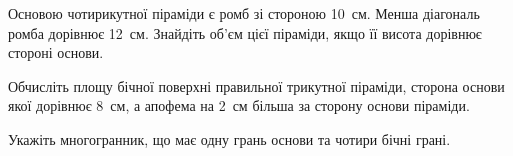 \documentclass[12pt]{article}
\begin{document}
\begin{samepage}
\noindent\zadnum Основою чотирикутної піраміди є ромб зі стороною 10~см. Менша діагональ ромба дорівнює 12~см. Знайдіть об’єм цієї піраміди, якщо її висота дорівнює стороні основи. 

\nmtnobreak
\nopagebreak\nbvspace{0.3cm}
\par{}
\end{samepage}

\begin{samepage}
\noindent\zadnum Обчисліть площу бічної поверхні правильної трикутної піраміди, сторона основи якої дорівнює 8~см, а апофема на 2~см більша за сторону основи піраміди. 

\nmtnobreak
\nopagebreak\nbvspace{0.3cm}
\par{}
\end{samepage}

\begin{samepage}
\noindent\zadnum Укажіть многогранник, що має одну грань основи та чотири бічні грані. 

\nmtnobreak
\nopagebreak\nbvspace{0.3cm}
\noindent
{}


\nmtnobreak
\nopagebreak\nbvspace{0.5cm}
\par{}\vspace{0.25cm}
\end{samepage}
\end{document}
